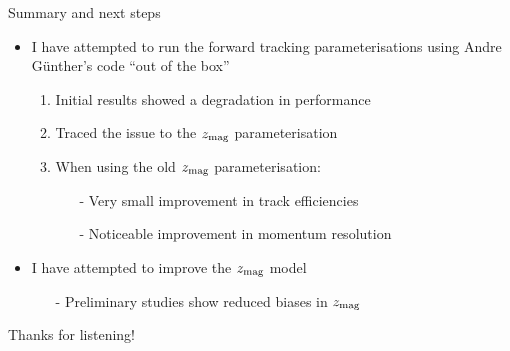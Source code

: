 \documentclass[xcolor={dvipsnames}]{beamer}
\begin{document}
\begin{frame}{Summary and next steps}
  \vspace{0.0cm}
  \begin{itemize}
    \setlength\itemsep{1.0em}
    \item{I have attempted to run the forward tracking parameterisations using Andre G{\"u}nther's code ``out of the box''}
    \begin{enumerate}
      \setlength\itemsep{0.3em}
      \item{Initial results showed a degradation in performance}
      \item{Traced the issue to the $z_{\rm mag}$ parameterisation}
      \item{When using the old $z_{\rm mag}$ parameterisation:}
      \begin{itemize}
        \item[-]{Very small improvement in track efficiencies}
        \item[-]{Noticeable improvement in momentum resolution}
      \end{itemize}
    \end{enumerate}
    \item{I have attempted to improve the $z_{\rm mag}$ model}
    \begin{itemize}
      \item[-]{Preliminary studies show reduced biases in $z_{\rm mag}$}
    \end{itemize}
  \end{itemize}
  \vspace{0.3cm}
  \begin{center}
    \Huge Thanks for listening!
  \end{center}
\end{frame}
\end{document}
